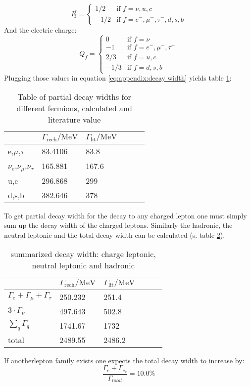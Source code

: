 \begin{equation}
I^f_3 = \begin{cases}
1/2 & \text{if } f = \nu,u,c\\
-1/2 & \text{if } f = e^-,\mu^-,\tau^-,d,s,b
\end{cases}
\end{equation}
And the electric charge:
\begin{equation}
Q_f = \begin{cases}
0 & \text{if } f = \nu\\
-1 & \text{if } f = e^-,\mu^-,\tau^-\\
2/3 & \text{if } f = u,c\\
-1/3 & \text{if } f = d,s,b
\end{cases}
\end{equation}
Plugging those values in equation \ref{eq:appendix:decay width} yields table \ref{tb:appendix:decay widths}:

\begin{table}[H]\centering
	\begin{tabular}{@{}llllll@{}}
		\toprule
		 & $\Gamma _{\text{rech}}\text{/MeV}$ & $\Gamma
		 _{\text{lit}}\text{/MeV}$ \\
		 \midrule
		 e,$\mu $,$\tau $ & 83.4106 & 83.8 \\
		 $\nu _e$,$\nu _{\mu }$,$\nu _{\tau }$ & 165.881 & 167.6 \\
		 u,c & 296.868 & 299 \\
		 d,s,b & 382.646 & 378 \\
		 \bottomrule
	\end{tabular}
	\caption[partial decay widths]{Table of partial decay widths for different fermions, calculated and literature value\cite{muenchen}}
	\label{tb:appendix:decay widths}
\end{table}
To get partial decay width for the decay to any charged lepton one must simply sum up the decay width of the charged leptons. Similarly the hadronic, the neutral leptonic and the total decay width can be calculated (s. table \ref{tb:appendix:summarized decay widths}).
\begin{table}[H]\centering
	\begin{tabular}{@{}llllll@{}}
		\toprule
		& $\Gamma _{\text{rech}}\text{/MeV}$ & $\Gamma
		_{\text{lit}}\text{/MeV}$ \\
		\midrule
		$\Gamma_e+\Gamma_{\mu}+\Gamma_{\tau}$ & 250.232 & 251.4 \\
		$3\cdot \Gamma_{\nu}$ & 497.643 & 502.8 \\
		$\sum_q\Gamma_q$ & 1741.67 & 1732 \\
		total & 2489.55 & 2486.2 \\
		\bottomrule
	\end{tabular}
	\caption[summarized decay widths]{summarized decay width: charge leptonic, neutral leptonic and hadronic}
	\label{tb:appendix:summarized decay widths}
\end{table}
If anotherlepton family exists one expects the total decay width to increase by:
\begin{equation}
\frac{\Gamma_e + \Gamma_{\nu_e}}{\Gamma_{total}}=10.0 \%
\end{equation}
